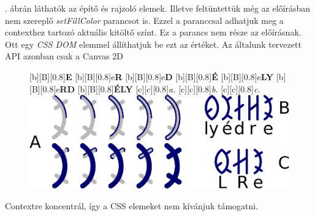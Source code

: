\documentclass[12pt]{report}
\theoremstyle{definition}
\begin{document}
. ábrán láthatók az építő és rajzoló
elemek. Illetve feltüntettük még az előírásban nem szereplő
\emph{setFillColor} parancsot is. Ezzel a paranccsal adhatjuk meg a
contexthez tartozó aktuális kitöltő színt. Ez a parancs nem része
az előírásnak. Ott egy \emph{CSS DOM} elemmel állíthatjuk be ezt
az értéket. Az általunk tervezett API azonban csak a Canvas 2D
    \begin{figure}[h]
    \centering
    [b][B][0.8]{\bf{E}}
    [b][B][0.8]{e\bf{R}}
    [b][B][0.8]{e\bf{D}}
    [b][B][0.8]{\bf{É}}
    [b][B][0.8]{e\bf{LY}}
    [b][B][0.8]{e\bf{RD}}
    [b][B][0.8]{\bf{ÉLY}}
    [c][c][0.8]{\it{a.}}
    [c][c][0.8]{\it{b.}}
    [c][c][0.8]{\it{c.}}
    \includegraphics[scale=0.6]{img/w3c_erdely_eps}
    \caption{\label{erdely}
    }
    \end{figure}
Contextre koncentrál, így a CSS elemeket nem kívánjuk támogatni.
\end{document}
